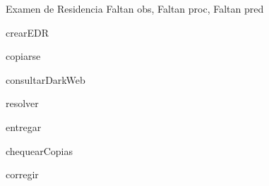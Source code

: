 \documentclass[11pt,a4paper]{article}
\begin{document}
\newpage 

\begin{tad}{Examen de Residencia}
   Faltan obs, Faltan proc, Faltan pred

\begin{proc}{crearEDR} {}
{} \end{proc}

\begin{proc}{copiarse} {}
{} \end{proc}

\begin{proc}{consultarDarkWeb} {}
{} \end{proc}

\begin{proc}{resolver} {}
{} \end{proc}


\begin{proc}{entregar} {}
{} \end{proc}

\begin{proc}{chequearCopias} {}
{} \end{proc}

\begin{proc}{corregir} {}
{} \end{proc}

\end{tad}
\end{document}
